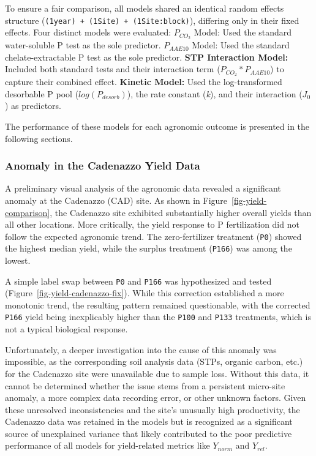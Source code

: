 \documentclass[
  a4paper,
]{article}
\begin{document}
To ensure a fair comparison, all models shared an identical random
effects structure
(\texttt{(1\textbar{}year)\ +\ (1\textbar{}Site)\ +\ (1\textbar{}Site:block)}),
differing only in their fixed effects. Four distinct models were
evaluated: \(P_{CO_2}\) Model: Used the standard water-soluble P test as
the sole predictor. \(P_{AAE10}\) Model: Used the standard
chelate-extractable P test as the sole predictor. \textbf{STP
Interaction Model:} Included both standard tests and their interaction
term (\(P_{CO_2} * P_{AAE10}\)) to capture their combined effect.
\textbf{Kinetic Model:} Used the log-transformed desorbable P pool
(\(log(P_{desorb})\)), the rate constant (\emph{k}), and their
interaction (\(J_0\)) as predictors.

The performance of these models for each agronomic outcome is presented
in the following sections.

\subsubsection{Anomaly in the Cadenazzo Yield
Data}\label{anomaly-in-the-cadenazzo-yield-data}

A preliminary visual analysis of the agronomic data revealed a
significant anomaly at the Cadenazzo (CAD) site. As shown in
Figure~\ref{fig-yield-comparison}, the Cadenazzo site exhibited
substantially higher overall yields than all other locations. More
critically, the yield response to P fertilization did not follow the
expected agronomic trend. The zero-fertilizer treatment (\texttt{P0})
showed the highest median yield, while the surplus treatment
(\texttt{P166}) was among the lowest.

A simple label swap between \texttt{P0} and \texttt{P166} was
hypothesized and tested (Figure~\ref{fig-yield-cadenazzo-fix}). While
this correction established a more monotonic trend, the resulting
pattern remained questionable, with the corrected \texttt{P166} yield
being inexplicably higher than the \texttt{P100} and \texttt{P133}
treatments, which is not a typical biological response.

Unfortunately, a deeper investigation into the cause of this anomaly was
impossible, as the corresponding soil analysis data (STPs, organic
carbon, etc.) for the Cadenazzo site were unavailable due to sample
loss. Without this data, it cannot be determined whether the issue stems
from a persistent micro-site anomaly, a more complex data recording
error, or other unknown factors. Given these unresolved inconsistencies
and the site's unusually high productivity, the Cadenazzo data was
retained in the models but is recognized as a significant source of
unexplained variance that likely contributed to the poor predictive
performance of all models for yield-related metrics like \(Y_{norm}\)
and \(Y_{rel}\).
\end{document}
